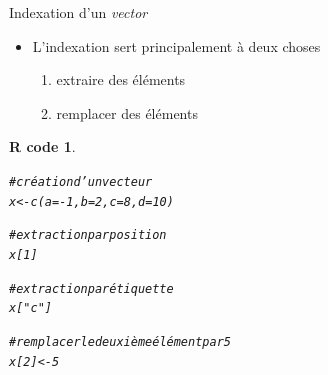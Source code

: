 \documentclass[11pt]{beamer}\usepackage[]{graphicx}\usepackage[]{color}
\makeatletter
\newcommand{\hlnum}[1]{\textcolor[rgb]{0.063,0.58,0.627}{#1}}%
\newcommand{\hlstr}[1]{\textcolor[rgb]{0.063,0.58,0.627}{#1}}%
\newcommand{\hlcom}[1]{\textcolor[rgb]{0.588,0.588,0.588}{#1}}%
\newcommand{\hlopt}[1]{\textcolor[rgb]{0.196,0.196,0.196}{#1}}%
\newcommand{\hlstd}[1]{\textcolor[rgb]{0.196,0.196,0.196}{#1}}%
\newcommand{\hlkwb}[1]{\textcolor[rgb]{0.627,0,0.314}{#1}}%
\newcommand{\hlkwc}[1]{\textcolor[rgb]{0,0.631,0.314}{#1}}%
\newcommand{\hlkwd}[1]{\textcolor[rgb]{0.78,0.227,0.412}{#1}}%
\newenvironment{kframe}{%
 \def\at@end@of@kframe{}%
 \ifinner\ifhmode%
  \def\at@end@of@kframe{\end{minipage}}%
  \begin{minipage}{\columnwidth}%
 \fi\fi%
 \def\FrameCommand##1{\hskip\@totalleftmargin \hskip-\fboxsep
 \colorbox{shadecolor}{##1}\hskip-\fboxsep
     \hskip-\linewidth \hskip-\@totalleftmargin \hskip\columnwidth}%
 \MakeFramed {\advance\hsize-\width
   \@totalleftmargin\z@ \linewidth\hsize
   \@setminipage}}%
 {\par\unskip\endMakeFramed%
 \at@end@of@kframe}
\newenvironment{knitrout}{}{} %
\newtheorem{rcode}{R code}[section]
\makeatother
\begin{document}
\begin{frame}[fragile]{Indexation d'un \textit{vector}}
\begin{itemize}
  \setlength\itemsep{2em}
\item L'indexation sert principalement à deux choses
\pause \begin{enumerate}
\normalsize
\item extraire des éléments 
\item remplacer des éléments
\end{enumerate}
\end{itemize}
\pause 
\begin{knitrout}
\color{fgcolor}\begin{kframe}
\begin{rcode}\label{unnamed-chunk-25}\begin{alltt}
\hlcom{# création d'un vecteur}
\hlstd{x} \hlkwb{<-} \hlkwd{c}\hlstd{(}\hlkwc{a} \hlstd{=} \hlopt{-}\hlnum{1}\hlstd{,} \hlkwc{b} \hlstd{=} \hlnum{2}\hlstd{,} \hlkwc{c} \hlstd{=} \hlnum{8}\hlstd{,} \hlkwc{d} \hlstd{=} \hlnum{10}\hlstd{)}

\hlcom{# extraction par position}
\hlstd{x[}\hlnum{1}\hlstd{]}

\hlcom{# extraction par étiquette}
\hlstd{x[}\hlstr{"c"}\hlstd{]}

\hlcom{# remplacer le deuxième élément par 5}
\hlstd{x[}\hlnum{2}\hlstd{]} \hlkwb{<-} \hlnum{5}
\end{alltt}
\end{rcode}\end{kframe}
\end{knitrout}
\end{frame}
\end{document}
